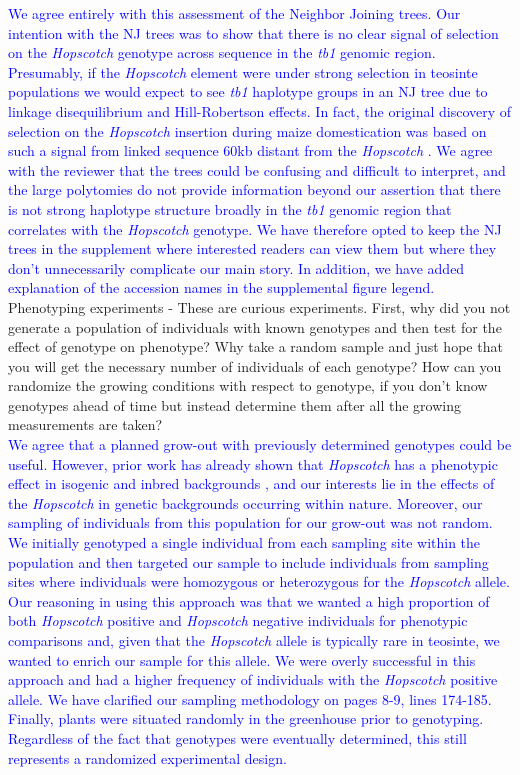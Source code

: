 \documentclass[11pt]{article}
\newcommand{\res}[1]{\noindent \textcolor{blue}{{#1}} \\}
\begin{document}
\res{We agree entirely with this assessment of the Neighbor Joining trees. 
Our intention with the NJ trees was to show that there is no clear signal of selection on the \emph{Hopscotch} genotype across sequence in the \emph{tb1} genomic region.
Presumably, if the \emph{Hopscotch} element were under strong selection in teosinte populations we would expect to see \emph{tb1} haplotype groups in an NJ tree due to linkage disequilibrium and Hill-Robertson effects.
In fact, the original discovery of selection on the \emph{Hopscotch} insertion during maize domestication was based on such a signal from linked sequence 60kb distant from the \emph{Hopscotch} \citep{Studer2011}. We agree with the reviewer that the trees could be confusing and difficult to interpret, and the large polytomies do not provide information beyond our assertion that there is not strong haplotype structure broadly in the \emph{tb1} genomic region that correlates with the \emph{Hopscotch} genotype.
We have therefore opted to keep the NJ trees in the supplement where interested readers can view them but where they don't unnecessarily complicate our main story.
In addition, we have added explanation of the accession names in the supplemental figure legend.}


Phenotyping experiments - These are curious experiments.  First, why did you not generate a population of individuals with known genotypes and then test for the effect of genotype on phenotype?  Why take a random sample and just hope that you will get the necessary number of individuals of each genotype?  How can you randomize the growing conditions with respect to genotype, if you don't know genotypes ahead of time but instead determine them after all the growing measurements are taken?\\

\res{We agree that a planned grow-out with previously determined genotypes could be useful.  
However, prior work has already shown that \emph{Hopscotch} has a phenotypic effect in isogenic and inbred backgrounds \citep{Studer2011}, and our interests lie in the effects of the \emph{Hopscotch} in genetic backgrounds occurring within nature.
Moreover, our sampling of individuals from this population for our grow-out was not random.  
We initially genotyped a single individual from each sampling site within the population and then targeted our sample to include individuals from sampling sites where individuals were homozygous or heterozygous for the \emph{Hopscotch} allele.
Our reasoning in using this approach was that we wanted a high proportion of both \emph{Hopscotch} positive and \emph{Hopscotch} negative individuals for phenotypic comparisons and, given that the \emph{Hopscotch} allele is typically rare in teosinte, we wanted to enrich our sample for this allele. 
We were overly successful in this approach and had a higher frequency of individuals with the \emph{Hopscotch} positive allele.
We have clarified our sampling methodology on pages 8-9, lines 174-185. Finally, plants were situated randomly in the greenhouse prior to genotyping.
Regardless of the fact that genotypes were eventually determined, this still represents a randomized experimental design.}
\end{document}
